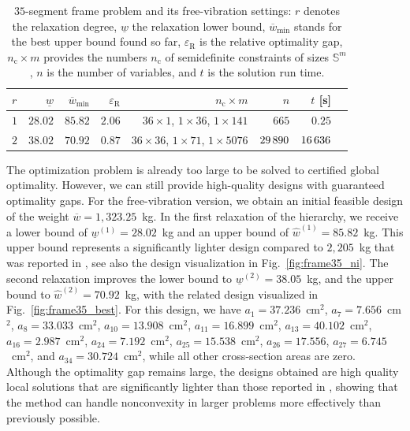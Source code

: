 \documentclass[preprint,3p]{elsarticle}
\newcommand{\R}{\mathrm{R}}
\numberwithin{equation}{section}
\begin{document}
\begin{table}[!b]
  \centering
    \begin{tabular}{lrrrrrrr}
		$r$ & $\underline{w}$ & $\overline{w}_{\min}$ & $\varepsilon_\R$ & $n_\mathrm{c}\times m$ & $n$ & $t$ [s]\\
		\hline
		$1$ & {$28.02$} & {$85.82$} & {$2.06$} & $36\times1$, $1\times 36$, $1\times141$ & $665$ & {$0.25$} \\
		$2$ & {$38.02$} & {$70.92$} & {$0.87$} & $36\times36$, $1\times 71$, $1\times5076$ & $29\thinspace890$ & {$16\thinspace636$} \\
		\end{tabular}
    \caption{$35$-segment frame problem and its free-vibration settings: $r$ denotes the relaxation degree, $\underline{w}$ the relaxation lower bound, $\overline{w}_{\min}$ stands for the best upper bound found so far, $\varepsilon_\R$ is the relative optimality gap, $n_\mathrm{c} \times m$ provides the numbers $n_\mathrm{c}$ of semidefinite constraints of sizes $\mathbb{S}^m$, $n$ is the number of variables, and $t$ is the solution run time.}
    \label{tab:frame35}
\end{table}

The optimization problem is already too large to be solved to certified global optimality. However, we can still provide high-quality designs with guaranteed optimality gaps. For the free-vibration version, we obtain an initial feasible design of the weight $\overline{w} = 1,323.25$~kg. In the first relaxation of the hierarchy, we receive a lower bound of $\underline{w}^{(1)} = 28.02$~kg and an upper bound of $\hat{w}^{(1)} = 85.82$~kg. This upper bound represents a significantly lighter design compared to $2,205$~kg that was reported in \citep{Ni2014}, see also the design visualization in Fig.~\ref{fig:frame35_ni}. The second relaxation improves the lower bound to $\underline{w}^{(2)} = 38.05$~kg, and the upper bound to $\hat{w}^{(2)} = 70.92$~kg, with the related design visualized in Fig.~\ref{fig:frame35_best}. 
For this design, we have $a_1=37.236$~cm$^2$, $a_7 = 7.656$~cm$^2$, $a_8 = 33.033$~cm$^2$, $a_{10}=13.908$~cm$^2$, $a_{11} = 16.899$~cm$^2$, $a_{13} = 40.102$~cm$^2$, $a_{16} = 2.987$~cm$^2$, $a_{24} = 7.192$~cm$^2$, $a_{25} = 15.538$~cm$^2$, $a_{26} = 17.556$, $a_{27} = 6.745$~cm$^2$, and $a_{34} = 30.724$~cm$^2$, while all other cross-section areas are zero.
Although the optimality gap remains large, the designs obtained are high quality local solutions that are significantly lighter than those reported in \citep{Ni2014}, showing that the method can handle nonconvexity in larger problems more effectively than previously possible.
\end{document}
